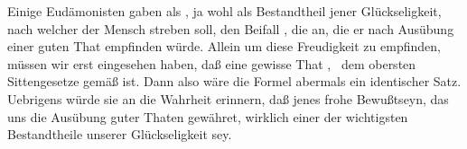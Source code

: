 \begin{aufzb}
\item Einige Eudämonisten gaben als , ja wohl als  Bestandtheil jener Glückseligkeit, nach welcher der Mensch streben soll, den Beifall , die  an, die er nach Ausübung einer guten That empfinden würde. Allein um diese Freudigkeit zu empfinden, müssen wir erst eingesehen haben, daß eine gewisse That , \dh\ dem obersten Sittengesetze gemäß ist. Dann also wäre die Formel abermals ein identischer Satz. Uebrigens würde sie an die Wahrheit erinnern, daß jenes frohe Bewußtseyn, das uns die Ausübung guter Thaten gewähret, wirklich einer der wichtigsten Bestandtheile unserer Glückseligkeit sey.~
\end{aufzb}
\begin{aufza}\setcounter{enumi}{15}

\end{aufza}
